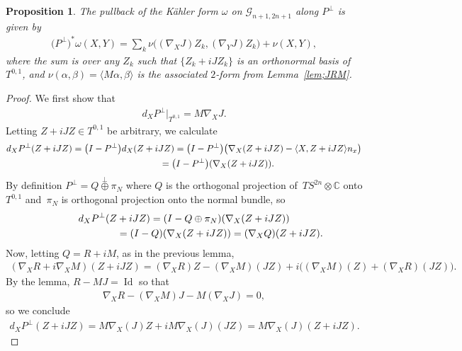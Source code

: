 \documentclass[10pt,a4paper]{amsart}
\newtheorem{prop}[thm]{Proposition}
{ \theoremstyle{definition} \newtheorem{defn}[thm]{Definition}
 \newtheorem{ex}[thm]{Example}
 \newtheorem{rmk}[thm]{Remark}}
\numberwithin{equation}{section}
\newcommand{\CC}{\mathbb{C}}
\newcommand{\cG}{{\mathcal G}}
\begin{document}
\begin{prop} \label{prop;pull}The pullback of the K\"ahler form $\omega$ on $ \cG_{n+1,2n+1}$ along $P^\perp$ is given by
\begin{gather} \label{eq;pullomega}
\big(P^\perp\big)^*\omega(X,Y) = \sum_k \nu \big( (\nabla_X J) Z_k, (\nabla_Y J) Z_k \big) + \nu (X , Y),
\end{gather}
where the sum is over any $Z_k$ such that $\{Z_k + i J Z_k\}$ is an orthonormal basis of $T^{0,1}$, and $\nu(\alpha ,\beta) = \langle M \alpha, \beta \rangle$ is the associated $2$-form from Lemma~{\rm \ref{lem;JRM}}.
\end{prop}

\begin{proof}We first show that
\begin{gather*}
d_X P^\perp\big|_{T^{0,1}} = M \nabla_X J.
\end{gather*}
Letting $Z + iJZ \in T^{0,1}$ be arbitrary, we calculate
\begin{gather*}
d_X P^\perp (Z + i JZ) = \big(I-P^\perp\big) d_X (Z + iJZ)= \big(I-P^\perp\big) \big( \nabla_X(Z+iJZ) -\langle X,Z + i JZ\rangle n_x \big) \\
\hphantom{d_X P^\perp (Z + i JZ)}{} = \big(I-P^\perp\big) (\nabla_X(Z+iJZ)).
\end{gather*}
By definition $P^\perp = Q \stackrel{{\perp}}{\oplus} \pi_{N}$ where $Q$ is the orthogonal projection of~$TS^{2n} \otimes \CC$ onto $T^{0,1}$ and~$\pi_N$ is orthogonal projection onto the normal bundle, so
\begin{gather*}
d_X P^\perp (Z + i JZ) =(I- Q \oplus \pi_{N}) ( \nabla_X(Z+iJZ) ) \\
\hphantom{d_X P^\perp (Z + i JZ)}{} = (I-Q) ( \nabla_X(Z+iJZ) ) = (\nabla_X Q) (Z+iJZ).
\end{gather*}
Now, letting $Q= R + iM$, as in the previous lemma,
\begin{gather*}
(\nabla_X R + i \nabla_X M) (Z+iJZ) = ( \nabla_X R ) Z - (\nabla_X M) (JZ)
+ i \big( (\nabla_X M) (Z) + (\nabla_X R) (JZ) \big).
\end{gather*}
By the lemma, $R-MJ= \operatorname{Id}$ so that
\begin{gather*}
\nabla_X R - (\nabla_X M) J - M (\nabla_X J)= 0,
\end{gather*}
so we conclude
\begin{gather*}
d_X P^\perp (Z + i JZ) = M \nabla_X (J) Z + i M \nabla_X(J) (J Z) = M \nabla_X(J) (Z+iJZ).
\end{gather*}


\end{proof}
\end{document}

